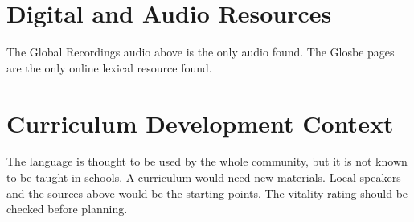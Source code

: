 \documentclass[12pt]{article}
\begin{document}
\section{Digital and Audio Resources}
The Global Recordings audio above is the only audio found. The Glosbe pages are the only online lexical resource found.

\section{Curriculum Development Context}
The language is thought to be used by the whole community, but it is not known to be taught in schools. A curriculum would need new materials. Local speakers and the sources above would be the starting points. The vitality rating should be checked before planning.
\end{document}
